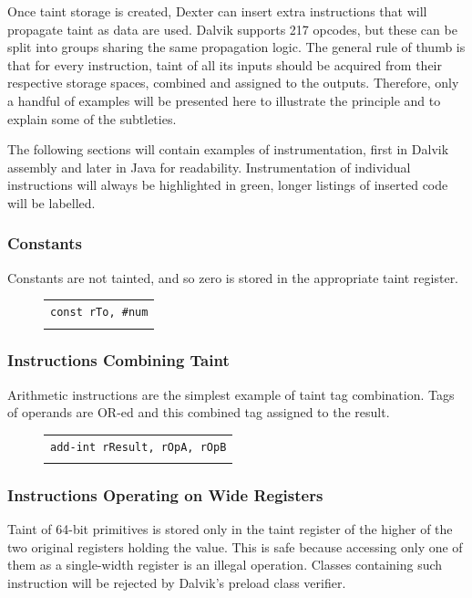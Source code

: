\documentclass[12pt,twoside,notitlepage]{report}
\newcommand{\centerbox}[1] {
	\begin{center}
	\begin{footnotesize}
	\begin{tabular}{l}
	#1
	\end{tabular}
	\end{footnotesize}
	\end{center}
}
\newcommand{\highlight}[1]{\colorbox{lightOrange}{\strut #1}}
\newcommand{\asm}[1] {\texttt{#1}}
\newcommand{\asmExtra}[1] {\texttt{\highlight{#1}}}
\begin{document}
Once taint storage is created, Dexter can insert extra instructions that will propagate taint as data are used. Dalvik supports 217 opcodes, but these can be split into groups sharing the same propagation logic. The general rule of thumb is that for every instruction, taint of all its inputs should be acquired from their respective storage spaces, combined and assigned to the outputs. Therefore, only a handful of examples will be presented here to illustrate the principle and to explain some of the subtleties.

The following sections will contain examples of instrumentation, first in Dalvik assembly and later in Java for readability. Instrumentation of individual instructions will always be highlighted in green, longer listings of inserted code will be labelled.

\subsubsection{Constants}

Constants are not tainted, and so zero is stored in the appropriate taint register.

	\begin{figure}[H]
		\centerbox{
			\asm{const rTo, \#num} \\
			\asmExtra{const tTo, \#0}
		}
	\end{figure}

\subsubsection{Instructions Combining Taint}

Arithmetic instructions are the simplest example of taint tag combination. Tags of operands are OR-ed and this combined tag assigned to the result.

	\begin{figure}[H]
		\centerbox{
			\asm{add-int~rResult, rOpA, rOpB} \\
			\asmExtra{or-int~~tResult, tOpA, tOpB}
		}
	\end{figure}

\subsubsection{Instructions Operating on Wide Registers}

Taint of 64-bit primitives is stored only in the taint register of the higher of the two original registers holding the value. This is safe because accessing only one of them as a single-width register is an illegal operation. Classes containing such instruction will be rejected by Dalvik's preload class verifier.
\end{document}

